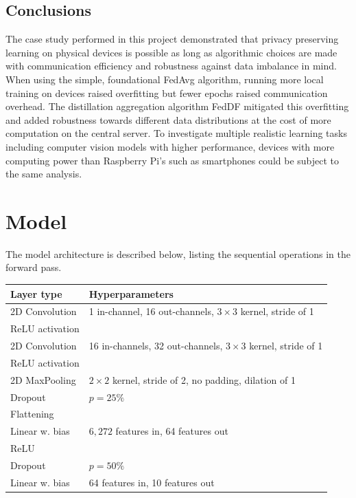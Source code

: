 \documentclass{article}
\begin{document}
\subsection{Conclusions}
The case study performed in this project demonstrated that privacy preserving learning on physical devices is possible as long as algorithmic choices are made with communication efficiency and robustness against data imbalance in mind.
When using the simple, foundational FedAvg algorithm, running more local training on devices raised overfitting but fewer epochs raised communication overhead.
The distillation aggregation algorithm FedDF mitigated this overfitting and added robustness towards different data distributions at the cost of more computation on the central server.
To investigate multiple realistic learning tasks including computer vision models with higher performance, devices with more computing power than Raspberry Pi's such as smartphones could be subject to the same analysis.

\vfill
\pagebreak




\appendix
\section{Model}
\label{app:model}
The model architecture is described below, listing the sequential operations in the forward pass.
\begin{table}[htb!]
    \centering
    \begin{tabular}{l|p{5cm}}
            Layer type & Hyperparameters\\
            \hline
            2D Convolution & 1 in-channel, 16 out-channels, $3\times 3$ kernel, stride of 1\\
            ReLU activation\\
            2D Convolution & 16 in-channels, 32 out-channels, $3\times 3$ kernel, stride of 1\\
            ReLU activation\\
            2D MaxPooling & $2\times 2$ kernel, stride of 2, no padding, dilation of 1\\
            Dropout & $p=25\%$\\
            Flattening\\
            Linear w. bias & $6,272$ features in, 64 features out\\
            ReLU \\
            Dropout & $p=50\%$\\
            Linear w. bias & 64 features in, 10 features out
        \end{tabular}
\end{table}\noindent
\end{document}
